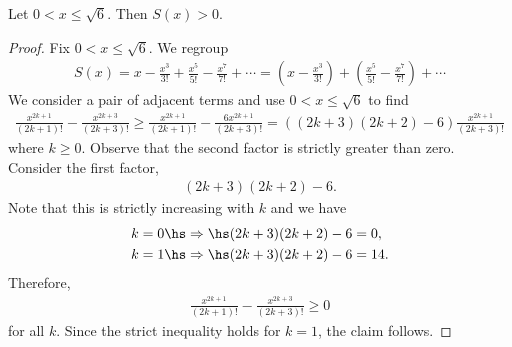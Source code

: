 \documentclass{article}
\begin{document}
\begin{claim*}
   Let $0<x\leq \sqrt{6}$. Then $S(x)>0$.
\end{claim*}
\begin{proof}
   Fix $0<x\leq\sqrt{6}$. We regroup
   \begin{align*}
      S(x) = x - \frac{x^3}{3!} + \frac{x^5}{5!} - \frac{x^7}{7!} + \cdots
      = \left(x - \frac{x^3}{3!}\right) + \left(\frac{x^5}{5!} - \frac{x^7}{7!}\right) + \cdots
   \end{align*}
   We consider a pair of adjacent terms and use $0<x\leq\sqrt{6}$ to find
   \begin{align*}
      \frac{x^{2k+1}}{(2k+1)!} - \frac{x^{2k+3}}{(2k+3)!}
      \geq \frac{x^{2k+1}}{(2k+1)!}-\frac{6x^{2k+1}}{(2k+3)!}
      = ((2k+3)(2k+2)-6)\frac{x^{2k+1}}{(2k+3)!}
   \end{align*}
   where $k\geq 0$.
   Observe that the second factor is strictly greater than zero. Consider the first factor,
   \begin{align*}
      (2k+3)(2k+2) - 6.
   \end{align*}
   Note that this is strictly increasing with $k$ and we have
   \begin{align*}
      k=0 \hs & \Rightarrow\hs (2k+3)(2k+2) - 6 = 0,  \\
      k=1 \hs & \Rightarrow\hs (2k+3)(2k+2) - 6 = 14. \\
   \end{align*}
   Therefore,
   \begin{align*}
      \frac{x^{2k+1}}{(2k+1)!} - \frac{x^{2k+3}}{(2k+3)!} \geq 0
   \end{align*}
   for all $k$. Since the strict inequality holds for $k=1$, the claim follows.
\end{proof}
\end{document}
